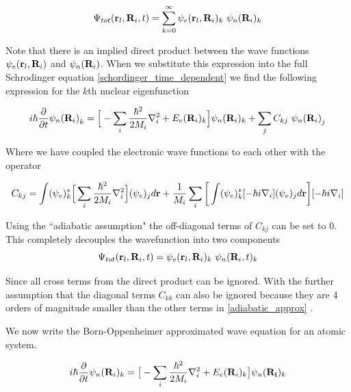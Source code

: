 \begin{equation}
	\Psi_{tot} (\bold{r}_l,\bold{R}_i, t) = \sum_{k=0}^\infty {\psi_e}(\bold{r}_l, \bold{R}_i)_k\ {\psi_n}(\bold{R}_i)_k
\end{equation}

Note that there is an implied direct product between the wave functions $\psi_e(\bold{r}_l, \bold{R}_i)$ and $\psi_n(\bold{R}_i)$. When we substitute this expression into the full Schrodinger equation \ref{schordinger_time_dependent} we find the following expression for the $k$th nuclear eigenfunction \cite{miller1976} 

\begin{equation}
	i \hbar \frac{\partial} {\partial t} {\psi_n(\bold{R}_i)}_k = \Big[- \sum_i \frac{\hbar^2}{2M_i} \nabla^2_i  + {E_e} (\bold{R}_i)_k\Big] \psi_n (\bold{R}_i)_k + \sum_j C_{kj} \ {\psi_n(\bold{R}_i)}_j 
	\label{adiabatic_approx}
\end{equation}

Where we have coupled the electronic wave functions to each other with the operator 

\begin{equation}
	C_{kj} = \int ({\psi_e})_k ^* \Big[\sum_i\frac{\hbar^2}{2M_i}\nabla^2_i\Big] ({\psi_e})_j d\bold{r}  + \frac{1}{M_i}\sum_{i}\bigg[ \int({\psi_e})_k ^* [-\hbar i \nabla_i]({\psi_e})_jd\bold{r}\bigg] [-\hbar i \nabla_i]
\end{equation}

Using the ``adiabatic assumption" \cite{miller1976} the off-diagonal terms of $C_{kj}$ can be set to $0$. This completely decouples the wavefunction into two components 
\begin{equation}
	\Psi_{tot} (\bold{r}_l,\bold{R}_i, t) = {\psi_e}(\bold{r}_l, \bold{R}_i)_k\ {\psi_n}(\bold{R}_i,t)_k
\end{equation}

Since all cross terms from the direct product can be ignored. With the further assumption that the diagonal terms $C_{kk}$ can also be ignored because they are 4 orders of magnitude smaller than the other terms in \ref{adiabatic_approx} \cite{sherrill}.

We now write the Born-Oppenheimer approximated wave equation for an atomic system.  


\begin{equation}
	i\hbar \frac{\partial}{\partial t} \psi_n(\bold{R}_i)_k = \big[ -\sum_i \frac{\hbar^2}{2M_i} \nabla^2_i + E_e(\bold{R}_i)_k\big] \psi_n(\bold{R_i})_k 
\end{equation}

